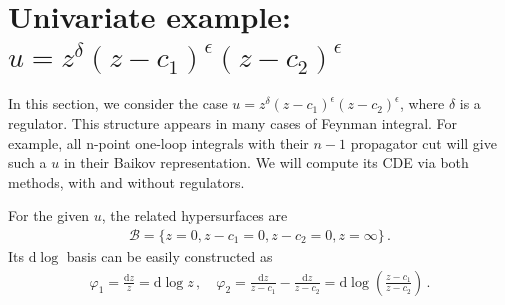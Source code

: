 \documentclass[a4paper,11pt]{article}
\newcommand{\nd}{\mathrm{d}}
\newcommand{\ep}{\epsilon}
\begin{document}

\section{Univariate example: $u=z^\delta (z-c_1)^\ep(z-c_2)^\ep$} \label{sec:eg1}

In this section, we consider the case $u=z^\delta (z-c_1)^\ep(z-c_2)^\ep$, where $\delta$ is a regulator. This structure appears in many cases of Feynman integral. For example, all n-point one-loop integrals with their $n-1$ propagator cut will give such a $u$ in their Baikov representation. We will compute its CDE via both methods, with and without regulators. 

For the given $u$, the related hypersurfaces are
\begin{align}
\mathcal{B}=\{z=0,z-c_1=0,z-c_2=0,z=\infty\} \,.
\end{align}
Its $\nd \log$ basis can be easily constructed as
\begin{align}
\varphi_1 = \frac{\nd z}{z} =\nd \log z \, ,  \quad \varphi_2 = \frac{\nd z}{z-c_1} - \frac{\nd z}{z-c_2}  = \nd \log \left( \frac{z-c_1}{z-c_2}\right)  \, .
\end{align}

\end{document}
